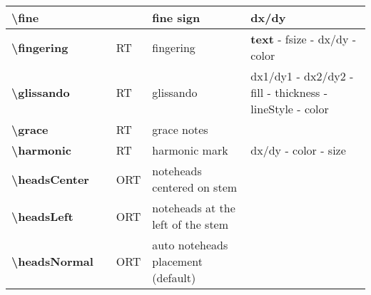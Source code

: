\documentclass[a4paper, landscape, 10pt]{article}
\begin{document}
\begin{tabularx}{\linewidth}{p{3cm}p{4.5cm}p{3cm}p{5.5cm}l}
    \hline
    \textbf{\textbackslash{}fine}&&&fine sign&dx/dy\\
    \hline
    \textbf{\textbackslash{}fingering}&&RT&fingering&\textbf{text} - fsize - dx/dy - color\\
    \hline
    \textbf{\textbackslash{}glissando}&&RT&glissando&dx1/dy1 - dx2/dy2 - fill - thickness - lineStyle - color\\
    \hline
    \textbf{\textbackslash{}grace}&&RT&grace notes&\\
    \hline
    \textbf{\textbackslash{}harmonic}&&RT&harmonic mark&dx/dy - color - size\\
    \hline
    \textbf{\textbackslash{}headsCenter}&&ORT&noteheads centered on stem&\\
    \hline
    \textbf{\textbackslash{}headsLeft}&&ORT&noteheads at the left of the stem&\\
    \hline
    \textbf{\textbackslash{}headsNormal}&&ORT&auto noteheads placement (default)&\\
    \hline
\end{tabularx}
%
%
\end{document}

